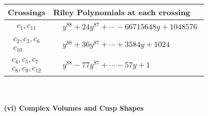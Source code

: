 \documentclass[1p]{elsarticle_modified}
\theoremstyle{definition}
\begin{document}
\begin{tabular}{m{50pt}|m{274pt}}
Crossings & \hspace{64pt}Riley Polynomials at each crossing \\
\hline $$\begin{aligned}c_{1},c_{11}\end{aligned}$$&$\begin{aligned}
&y^{88}+24 y^{87}+\cdots-66715648 y+1048576
\end{aligned}$\\
\hline $$\begin{aligned}c_{2},c_{3},c_{6}\\c_{10}\end{aligned}$$&$\begin{aligned}
&y^{88}+36 y^{87}+\cdots+3584 y+1024
\end{aligned}$\\
\hline $$\begin{aligned}c_{4},c_{5},c_{7}\\c_{8},c_{9},c_{12}\end{aligned}$$&$\begin{aligned}
&y^{88}-77 y^{87}+\cdots-57 y+1
\end{aligned}$\\
\hline
\end{tabular}\\~\\
\newpage\flushleft \textbf{(vi) Complex Volumes and Cusp Shapes}
\end{document}
